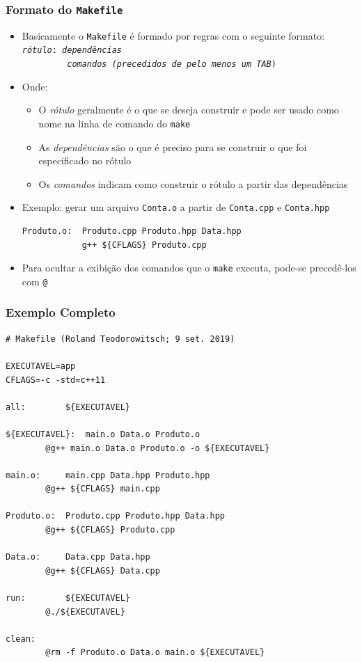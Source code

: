 \documentclass[aspectratio=169]{beamer}
\begin{document}
\begin{frame}[fragile]\frametitle{Formato do \texttt{Makefile}}
\begin{itemize}
	\item Basicamente o \texttt{Makefile} é formado por regras com o seguinte formato:\\
\texttt{\emph{rótulo}:   \emph{dependências}\\
~ ~ ~ ~ ~\emph{comandos (precedidos de pelo menos um TAB})}
	\item Onde:
	\begin{itemize}
		\item O \emph{rótulo} geralmente é o que se deseja construir e pode ser usado como nome na linha de comando do \texttt{make}
		\item As \emph{dependências} são o que é preciso para se construir o que foi especificado no rótulo
		\item Os \emph{comandos} indicam como construir o rótulo a partir das dependências
	\end{itemize}
	\item Exemplo: gerar um arquivo \texttt{Conta.o} a partir de \texttt{Conta.cpp} e \texttt{Conta.hpp}
\begin{lstlisting}
Produto.o:  Produto.cpp Produto.hpp Data.hpp
            g++ ${CFLAGS} Produto.cpp
\end{lstlisting}
	\item Para ocultar a exibição dos comandos que o \texttt{make} executa, pode-se precedê-los com \texttt{@}
\end{itemize}
\end{frame}

\begin{frame}[fragile]\frametitle{Exemplo Completo}
\begin{lstlisting}[basicstyle=\ttfamily\tiny]
# Makefile (Roland Teodorowitsch; 9 set. 2019)

EXECUTAVEL=app
CFLAGS=-c -std=c++11

all:		${EXECUTAVEL}

${EXECUTAVEL}:	main.o Data.o Produto.o
		@g++ main.o Data.o Produto.o -o ${EXECUTAVEL}

main.o:		main.cpp Data.hpp Produto.hpp
		@g++ ${CFLAGS} main.cpp

Produto.o:	Produto.cpp Produto.hpp Data.hpp
		@g++ ${CFLAGS} Produto.cpp

Data.o:		Data.cpp Data.hpp
		@g++ ${CFLAGS} Data.cpp

run:		${EXECUTAVEL}
		@./${EXECUTAVEL}

clean:
		@rm -f Produto.o Data.o main.o ${EXECUTAVEL}
\end{lstlisting}
\end{frame}
\end{document}

